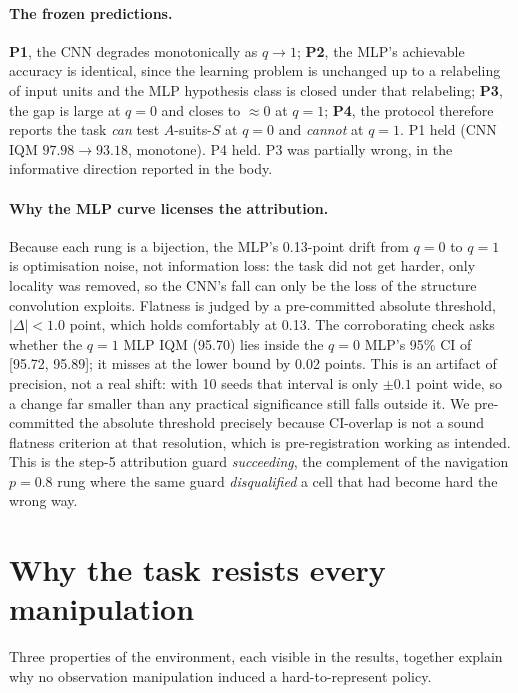 \paragraph{The frozen predictions.} \textbf{P1}, the CNN degrades monotonically as
$q \to 1$; \textbf{P2}, the MLP's achievable accuracy is identical, since the learning problem
is unchanged up to a relabeling of input units and the MLP hypothesis class is closed under
that relabeling; \textbf{P3}, the gap is large at $q=0$ and closes to ${\approx}0$ at $q=1$;
\textbf{P4}, the protocol therefore reports the task \emph{can} test $A$-suits-$S$ at $q=0$
and \emph{cannot} at $q=1$. P1 held (CNN IQM $97.98 \to 93.18$, monotone). P4 held. P3 was
partially wrong, in the informative direction reported in the body.

\paragraph{Why the MLP curve licenses the attribution.} Because each rung is a bijection, the
MLP's 0.13-point drift from $q=0$ to $q=1$ is optimisation noise, not information loss: the
task did not get harder, only locality was removed, so the CNN's fall can only be the loss of
the structure convolution exploits. Flatness is judged by a pre-committed absolute threshold,
$|\Delta| < 1.0$ point, which holds comfortably at 0.13. The corroborating check asks whether
the $q=1$ MLP IQM (95.70) lies inside the $q=0$ MLP's 95\% CI of [95.72, 95.89]; it misses at
the lower bound by 0.02 points. This is an artifact of precision, not a real shift: with 10
seeds that interval is only ${\pm}0.1$ point wide, so a change far smaller than any practical
significance still falls outside it. We pre-committed the absolute threshold precisely because
CI-overlap is not a sound flatness criterion at that resolution, which is pre-registration
working as intended. This is the step-5 attribution guard \emph{succeeding}, the complement of
the navigation $p=0.8$ rung where the same guard \emph{disqualified} a cell that had become
hard the wrong way.

\clearpage
\section{Why the task resists every manipulation}
\label{app:mechanism}

Three properties of the environment, each visible in the results, together explain why no
observation manipulation induced a hard-to-represent policy.


